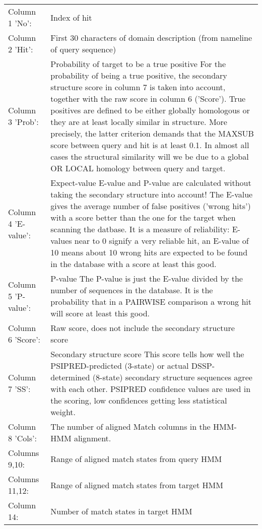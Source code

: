 \documentclass[11pt,a4paper]{article}
\begin{document}
\renewcommand{\arraystretch}{1.2}
\begin{longtable}{lp{120mm}}
Column 1 'No': & Index of hit\\

Column 2 'Hit': & First 30 characters of domain description (from nameline of query sequence)\\

Column 3 'Prob': & Probability of target to be a true positive
For the probability of being a true positive, the secondary structure score 
in column 7 is taken into account, together with the raw score in column 6 ('Score'). 
True positives are defined to be either globally homologous or they are at least 
locally similar in structure. More precisely, the latter criterion demands that 
the MAXSUB score between query and hit is at least 0.1. In almost all cases the 
structural similarity will we be due to a global OR LOCAL homology between query 
and target. \\

Column 4 'E-value': & Expect-value
E-value and P-value are calculated without taking the secondary structure into account!
The E-value gives the average number of false positives ('wrong hits') with a score 
better than the one for the target when scanning the datbase. It is a measure of 
reliability: E-values near to 0 signify a very reliable hit, an E-value of 10 means 
about 10 wrong hits are expected to be found in the database with a score at least 
this good.\\

Column 5 'P-value': & P-value
The P-value is just the E-value divided by the number of sequences in the database.
It is the probability that in a PAIRWISE comparison a wrong hit will score at least 
this good.\\

Column 6 'Score': & Raw score, does not include the secondary structure score\\

Column 7 'SS':    & Secondary structure score
This score tells how well the PSIPRED-predicted (3-state) or actual DSSP-determined 
(8-state) secondary structure sequences agree with each other. PSIPRED confidence 
values are used in the scoring, low confidences getting less statistical weight.\\

Column 8 'Cols': & The number of aligned Match columns in the HMM-HMM alignment.\\

Columns 9,10: &  Range of aligned match states from query HMM\\

Columns 11,12: & Range of aligned match states from target HMM\\
Column 14: & Number of match states in target HMM\\
\end{longtable}
\end{document}
